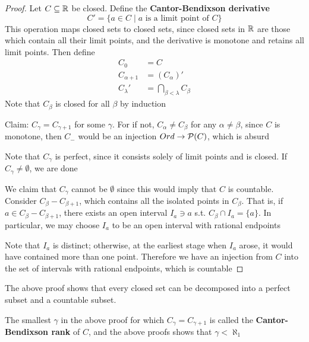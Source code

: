 \documentclass[11pt]{article}
\begin{document}
\begin{proof}
Let \(C\subseteq\mathbb{R}\) be closed. Define the \textbf{Cantor-Bendixson derivative}
\begin{equation*}
C'=\{a\in C\mid a\text{ is a limit point of }C\}
\end{equation*}
This operation maps closed sets to closed sets, since closed sets in \(\mathbb{R}\) are those which
contain all their limit points, and the derivative is monotone and retains all limit points.
Then define
\begin{align*}
C_0&=C\\
C_{\alpha+1}&=(C_\alpha)'\\
C_\lambda'&=\bigcap_{\beta<\lambda}C_\beta
\end{align*}
Note that \(C_\beta\) is closed for all \(\beta\) by induction

Claim: \(C_\gamma=C_{\gamma+1}\) for some \(\gamma\). For if not, \(C_\alpha\neq C_\beta\) for any \(\alpha\neq\beta\), since \(C\) is
monotone, then \(C_{-}\) would be an injection \(Ord\to\mathcal{P}(C)\), which is absurd

Note that \(C_\gamma\) is perfect, since it consists solely of limit points and is closed. If \(C_\gamma\neq\emptyset\),
we are done

We claim that \(C_\gamma\) cannot be \(\emptyset\) since this would imply that \(C\)  is countable.
Consider \(C_\beta-C_{\beta+1}\), which contains all the isolated points in \(C_\beta\). That is,
if \(a\in C_\beta-C_{\beta+1}\), there exists an open interval \(I_a\ni a\) s.t. \(C_\beta\cap I_a=\{a\}\). In
particular, we may choose \(I_a\) to be an open interval with rational endpoints

Note that \(I_a\) is distinct; otherwise, at the earliest stage when \(I_a\) arose, it would have
contained more than one point. Therefore we have an injection from \(C\) into the set of
intervals with rational endpoints, which is countable
\end{proof}

\begin{remark}
The above proof shows that every closed set can be decomposed into a perfect subset and a
countable subset.
\end{remark}

\begin{definition}[]
The smallest \(\gamma\) in the above proof for which \(C_\gamma=C_{\gamma+1}\) is called the \textbf{Cantor-Bendixson rank}
of \(C\), and the above proofs shows that \(\gamma<\aleph_1\)
\end{definition}
\end{document}
